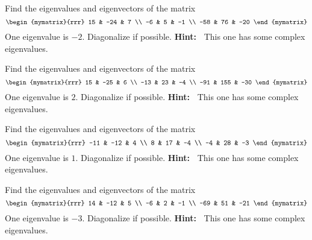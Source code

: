 \begin{enumialphparenastyle}

\begin{ex} Find the eigenvalues and eigenvectors of the matrix
\begin{equation*}
\begin{mymatrix}{rrr}
15 & -24 & 7 \\
-6 & 5 & -1 \\
-58 & 76 & -20
\end{mymatrix}
\end{equation*}
One eigenvalue is $-2. $ Diagonalize if possible. \textbf{Hint:\ }
This one has some complex eigenvalues.
\end{ex}

\begin{ex} Find the eigenvalues and eigenvectors of the matrix
\begin{equation*}
\begin{mymatrix}{rrr}
15 & -25 & 6 \\
-13 & 23 & -4 \\
-91 & 155 & -30
\end{mymatrix}
\end{equation*}
One eigenvalue is $2$. Diagonalize if possible. \textbf{Hint:\ }
This one has some complex eigenvalues.
\end{ex}

\begin{ex} Find the eigenvalues and eigenvectors of the matrix
\begin{equation*}
\begin{mymatrix}{rrr}
-11 & -12 & 4 \\
8 & 17 & -4 \\
-4 & 28 & -3
\end{mymatrix}
\end{equation*}
One eigenvalue is $1$. Diagonalize if possible. \textbf{Hint:\ }
This one has some complex eigenvalues.
\end{ex}

\begin{ex} Find the eigenvalues and eigenvectors of the matrix
\begin{equation*}
\begin{mymatrix}{rrr}
14 & -12 & 5 \\
-6 & 2 & -1 \\
-69 & 51 & -21
\end{mymatrix}
\end{equation*}
One eigenvalue is $-3$. Diagonalize if possible. \textbf{Hint:\ }
This one has some complex eigenvalues.
\end{ex}


\end{enumialphparenastyle}
